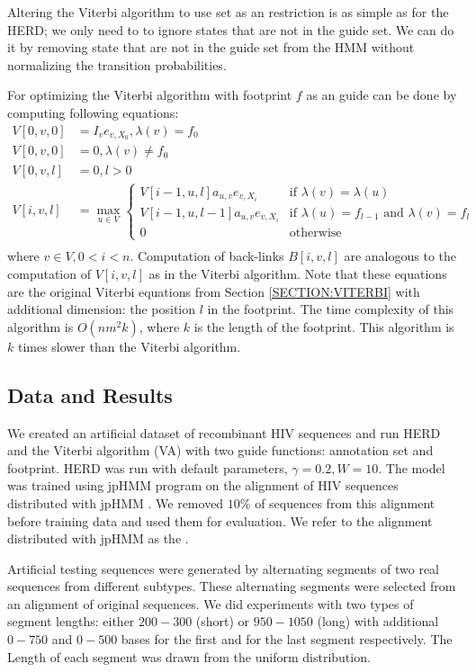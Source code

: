 Altering the Viterbi algorithm to use set as an restriction is as simple as for
the HERD; we only need to to ignore states that are not in the guide set. We
can do it by removing state that are not in the guide set from the HMM without
normalizing the transition probabilities. 

For optimizing the Viterbi algorithm with footprint $f$ as an guide can be done
by computing following equations:
\begin{align}
V[0,v, 0] &= I_{v}e_{v,X_0}, \lambda(v) = f_0\\
V[0,v, 0] &= 0, \lambda(v) \not= f_0\\
V[0,v, l] &= 0, l>0  \\
V[i,v, l] &= \max_{u\in V}\begin{cases}
V[i-1,u, l]a_{u,v}e_{v,X_i}& 
\text{if $\lambda(v) =\lambda(u)$}\\
V[i-1,u, l - 1]a_{u,v}e_{v,X_i} &
\text{if $\lambda(u) = f_{l-1}$ and $\lambda(v) = f_{l}$}\\
0 & \text{otherwise}
\end{cases}\\
\end{align}
where $v\in V,0<i<n$. Computation of back-links $B[i, v, l]$ are analogous to
the computation of $V[i, v, l]$ as in the Viterbi algorithm. Note that these
equations are the original Viterbi equations from Section \ref{SECTION:VITERBI}
with additional dimension: the position $l$ in the footprint. The time
complexity of this algorithm is $O(nm^2k)$, where $k$ is the length of the
footprint. This algorithm is $k$ times slower than the Viterbi algorithm.

\subsection{Data and Results}
We created an artificial dataset of recombinant HIV sequences and run HERD and
the Viterbi algorithm (VA) with two guide functions: annotation set and
footprint. HERD was run with default parameters, $\gamma=0.2, W=10$. The model
was trained using jpHMM program on the alignment of HIV sequences distributed
with jpHMM \cite{Schultz2006}. We removed $10\%$ of sequences from this
alignment before training data and used them for evaluation. We refer to the
alignment distributed with jpHMM as the .

Artificial testing sequences were generated by alternating segments of two real
sequences from different subtypes.  These alternating segments were selected
from an alignment of original sequences. We did experiments with two types of
segment lengths: either $200-300$ (short) or $950-1050$ (long) with additional
$0-750$ and $0-500$ bases for the first and for the last segment respectively.
The Length of each segment was drawn from the uniform distribution.

